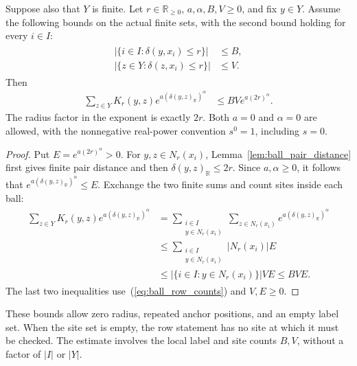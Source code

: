 \begin{theorem}
    \label{thm:ball_incidence_weighted_row}
    \leanok
    Suppose also that $Y$ is finite.  Let $r\in\mathbb R_{\geq0}$,
    $a,\alpha,B,V\geq0$, and fix $y\in Y$.
    Assume the following bounds on the actual finite sets, with the
    second bound holding for every $i\in I$:
    \begin{align}
        \begin{aligned}
            \bigl|\{i\in I:\delta(y,x_i)\leq r\}\bigr| & \leq B, \\
            \bigl|\{z\in Y:\delta(z,x_i)\leq r\}\bigr| & \leq V.
        \end{aligned}
        \label{eq:ball_row_counts}
    \end{align}
    Then
    \begin{align}
        \sum_{z\in Y}K_r(y,z)e^{a(\delta(y,z)_{\mathbb R})^\alpha}
         & \leq BV e^{a(2r)^\alpha}.
        \label{eq:ball_incidence_weighted_row}
    \end{align}
    The radius factor in the exponent is exactly $2r$.
    Both $a=0$ and $\alpha=0$ are allowed, with the nonnegative
    real-power convention $s^0=1$, including $s=0$.
\end{theorem}
\begin{proof}
    \leanok
    Put $E=e^{a(2r)^\alpha}>0$.
    For $y,z\in N_r(x_i)$, Lemma~\ref{lem:ball_pair_distance}
    first gives finite pair distance and then
    $\delta(y,z)_{\mathbb R}\leq2r$.
    Since $a,\alpha\geq0$, it follows that
    $e^{a(\delta(y,z)_{\mathbb R})^\alpha}\leq E$.
    Exchange the two finite sums and count sites inside each ball:
    \begin{align}
        \begin{aligned}
            \sum_{z\in Y}K_r(y,z)e^{a(\delta(y,z)_{\mathbb R})^\alpha}
             & =\sum_{\substack{i\in I                                \\y\in N_r(x_i)}}
            \sum_{z\in N_r(x_i)}e^{a(\delta(y,z)_{\mathbb R})^\alpha} \\
             & \leq\sum_{\substack{i\in I                             \\y\in N_r(x_i)}}|N_r(x_i)|E\\
             & \leq\bigl|\{i\in I:y\in N_r(x_i)\}\bigr|VE
            \leq BVE.
        \end{aligned}
        \label{eq:ball_row_counting}
    \end{align}
    The last two inequalities use~(\ref{eq:ball_row_counts}) and
    $V,E\geq0$.
\end{proof}

These bounds allow zero radius, repeated anchor positions, and an
empty label set.  When the site set is empty, the row statement has
no site at which it must be checked.  The estimate involves the
local label and site counts $B,V$, without a factor of $|I|$ or $|Y|$.
